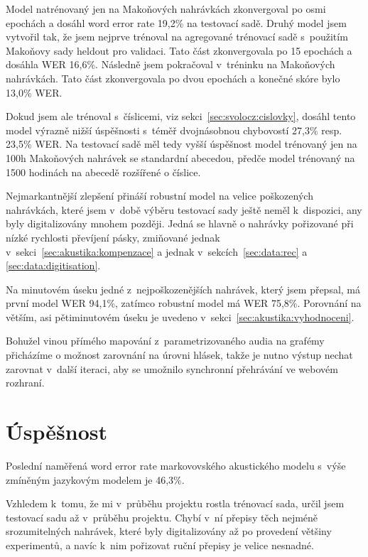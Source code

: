 Model natrénovaný jen na Makoňových nahrávkách zkonvergoval po osmi epochách a
dosáhl word error rate 19,2\% na testovací sadě. Druhý model jsem vytvořil tak,
že jsem nejprve trénoval na agregované trénovací sadě s~použitím Makoňovy
sady heldout pro validaci. Tato část zkonvergovala po 15 epochách a dosáhla WER
16,6\%. Následně jsem pokračoval v~tréninku na Makoňových nahrávkách. Tato část
zkonvergovala po dvou epochách a konečné skóre bylo 13,0\% WER.

Dokud jsem ale trénoval s~číslicemi, viz sekci~\ref{sec:svolocz:cislovky},
dosáhl tento model výrazně nižší úspěšnosti s~téměř dvojnásobnou chybovostí
27,3\% resp. 23,5\% WER.
Na testovací sadě měl tedy vyšší úspěšnost model trénovaný jen na 100h Makoňových
nahrávek se standardní abecedou, předče model trénovaný na 1500 hodinách na
abecedě rozšířené o číslice.


Nejmarkantnější zlepšení přináší robustní model na velice poškozených nahrávkách, které jsem
v~době výběru testovací sady ještě neměl k~dispozici, any byly digitalizovány
mnohem později. Jedná se hlavně o nahrávky pořizované při nízké rychlosti
převíjení pásky, zmiňované jednak v~sekci~\ref{sec:akustika:kompenzace} a jednak
v~sekcích~\ref{sec:data:rec} a \ref{sec:data:digitisation}.

Na minutovém úseku jedné z~nejpoškozenějších nahrávek, který jsem
přepsal, má první model WER 94,1\%, zatímco robustní model má WER
75,8\%. Porovnání na větším, asi pětiminutovém úseku je uvedeno
v~sekci~\ref{sec:akustika:vyhodnoceni}.

Bohužel vinou přímého mapování z~parametrizovaného audia na grafémy přicházíme o
možnost zarovnání na úrovni hlásek, takže je nutno výstup nechat zarovnat
v~další iteraci, aby se umožnilo synchronní přehrávání ve webovém rozhraní.

\section{Úspěšnost}
\label{sec:evaluace}

Poslední naměřená word error rate markovovského akustického modelu s~výše zmíněným
jazykovým modelem je 46,3\%.

Vzhledem k~tomu, že mi v~průběhu projektu rostla trénovací sada, určil jsem testovací sadu
až v~průběhu projektu. Chybí v~ní přepisy těch
nejméně srozumitelných nahrávek, které byly digitalizovány až po provedení
většiny experimentů, a navíc k~nim pořizovat ruční přepisy je velice nesnadné.

